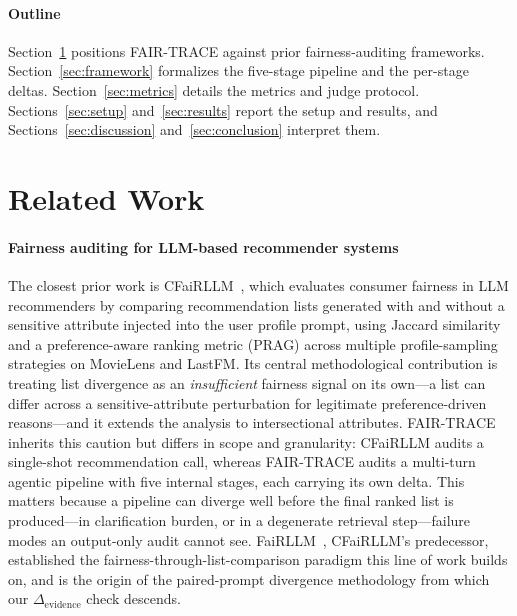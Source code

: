 \documentclass[manuscript,screen,review]{acmart}
\newcommand{\Devidence}{\Delta_{\mathrm{evidence}}}
\begin{document}
\paragraph{Outline}
Section~\ref{sec:related} positions FAIR-TRACE against prior fairness-auditing
frameworks. Section~\ref{sec:framework} formalizes the five-stage pipeline and
the per-stage deltas. Section~\ref{sec:metrics} details the metrics and judge
protocol. Sections~\ref{sec:setup} and~\ref{sec:results} report the setup and
results, and Sections~\ref{sec:discussion} and~\ref{sec:conclusion} interpret
them.

\section{Related Work}
\label{sec:related}

\paragraph{Fairness auditing for LLM-based recommender systems}
The closest prior work is CFaiRLLM~\cite{cfairllm}, which evaluates consumer
fairness in LLM recommenders by comparing recommendation lists generated with and
without a sensitive attribute injected into the user profile prompt, using
Jaccard similarity and a preference-aware ranking metric (PRAG) across multiple
profile-sampling strategies on MovieLens and LastFM. Its central methodological
contribution is treating list divergence as an \emph{insufficient} fairness
signal on its own---a list can differ across a sensitive-attribute perturbation
for legitimate preference-driven reasons---and it extends the analysis to
intersectional attributes. FAIR-TRACE inherits this caution but differs in scope
and granularity: CFaiRLLM audits a single-shot recommendation call, whereas
FAIR-TRACE audits a multi-turn agentic pipeline with five internal stages, each
carrying its own delta. This matters because a pipeline can diverge well before
the final ranked list is produced---in clarification burden, or in a degenerate
retrieval step---failure modes an output-only audit cannot see.
FaiRLLM~\cite{fairllm}, CFaiRLLM's predecessor, established the
fairness-through-list-comparison paradigm this line of work builds on, and is the
origin of the paired-prompt divergence methodology from which our $\Devidence$
check descends.
\end{document}
